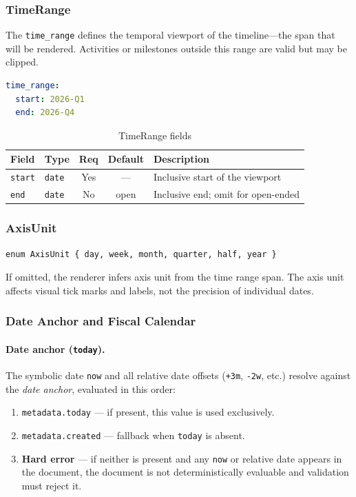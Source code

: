 \subsubsection{TimeRange}

The \texttt{time\_range} defines the temporal viewport of the timeline---the span that will
be rendered. Activities or milestones outside this range are valid but may be clipped.

\begin{lstlisting}[language=yaml]
time_range:
  start: 2026-Q1
  end: 2026-Q4
\end{lstlisting}

\begin{table}[h]
\centering
\begin{tabular}{llccp{5cm}}
\toprule
\textbf{Field} & \textbf{Type} & \textbf{Req} & \textbf{Default} & \textbf{Description} \\
\midrule
\texttt{start} & \texttt{date} & Yes & --- & Inclusive start of the viewport \\
\texttt{end} & \texttt{date} & No & open & Inclusive end; omit for open-ended \\
\bottomrule
\end{tabular}
\caption{TimeRange fields}
\label{tab:timerange-fields}
\end{table}

\subsubsection{AxisUnit}

\begin{lstlisting}
enum AxisUnit { day, week, month, quarter, half, year }
\end{lstlisting}

If omitted, the renderer infers axis unit from the time range span. The axis unit affects
visual tick marks and labels, not the precision of individual dates.

\subsubsection{Date Anchor and Fiscal Calendar}
\label{sec:date-anchor}

\paragraph{Date anchor (\texttt{today}).}
The symbolic date \texttt{now} and all relative date offsets (\texttt{+3m}, \texttt{-2w},
etc.) resolve against the \emph{date anchor}, evaluated in this order:
\begin{enumerate}
  \item \texttt{metadata.today} — if present, this value is used exclusively.
  \item \texttt{metadata.created} — fallback when \texttt{today} is absent.
  \item \textbf{Hard error} — if neither is present and any \texttt{now} or relative date
        appears in the document, the document is not deterministically evaluable and
        validation must reject it.
\end{enumerate}


